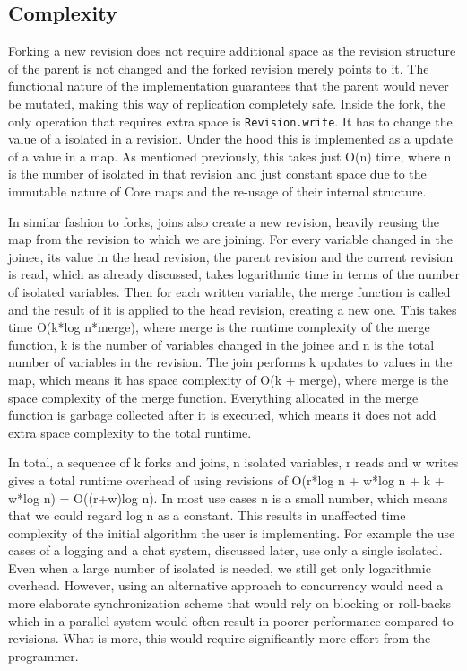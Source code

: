 \documentclass[12pt,twoside,notitlepage]{report}
\begin{document}
\subsection{Complexity}
Forking a new revision does not require additional space as the revision structure of the parent is not changed and the forked revision merely points to it. The functional nature of the implementation guarantees that the parent would never be mutated, making this way of replication completely safe. Inside the fork, the only operation that requires extra space is {\tt Revision.write}. It has to change the value of a isolated in a revision. Under the hood this is implemented as a update of a value in a map. As mentioned previously, this takes just O(n) time, where n is the number of isolated in that revision and just constant space due to the immutable nature of Core maps and the re-usage of their internal structure. 

In similar fashion to forks, joins also create a new revision, heavily reusing the map from the revision to which we are joining. For every variable changed in the joinee, its value in the head revision, the parent revision and the current revision is read, which as already discussed, takes logarithmic time in terms of the number of isolated variables. Then for each written variable, the merge function is called and the result of it is applied to the head revision, creating a new one. This takes time O(k*log n*merge), where merge is the runtime complexity of the merge function, k is the number of variables changed in the joinee and n is the total number of variables in the revision. The join performs k updates to values in the map, which means it has space complexity of O(k + merge), where merge is the space complexity of the merge function. Everything allocated in the merge function is garbage collected after it is executed, which means it does not add extra space complexity to the total runtime.

In total, a sequence of k forks and joins, n isolated variables, r reads and w writes gives a total runtime overhead of using revisions of O(r*log n + w*log n + k + w*log n) = O((r+w)log n). In most use cases n is a small number, which means that we could regard log n as a constant. This results in unaffected time complexity of the initial algorithm the user is implementing. For example the use cases of a logging and a chat system, discussed later, use only a single isolated. Even when a large number of isolated is needed, we still get only logarithmic overhead. However, using an alternative approach to concurrency would need a more elaborate synchronization scheme that would rely on blocking or roll-backs which in a parallel system would often result in poorer performance compared to revisions. What is more, this would require significantly more effort from the programmer.
\end{document}
